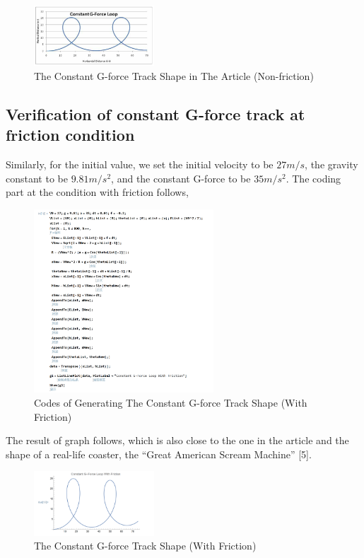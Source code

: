 \documentclass{article}
\begin{document}
\begin{figure}[H]
    \centering
    \includegraphics[width=0.4\textwidth]{4.png}
    \caption{The Constant G-force Track Shape in The Article (Non-friction)}
    \end{figure}  


\subsection{Verification of constant G-force track at friction condition}
Similarly, for the initial value, we set the initial velocity to be $27m/s$, the gravity constant to be $9.81m/s^2$, and the constant G-force to be $35m/s^2$. The coding part at the condition with friction follows,

\begin{figure}[H]
    \centering
    \includegraphics[width=0.6\textwidth]{5.png}
    \caption{Codes of Generating The Constant G-force Track Shape (With Friction)}
    \end{figure}  

The result of graph follows, which is also close to the one in the article and the shape of a real-life coaster, the “Great American Scream Machine” [5].

\begin{figure}[H]
    \centering
    \includegraphics[width=0.4\textwidth]{6.png}
    \caption{The Constant G-force Track Shape (With Friction)}
    \end{figure}  
    
\end{document}
